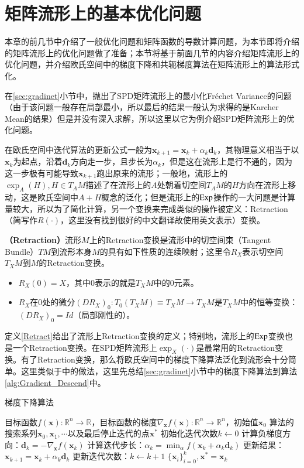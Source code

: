 \section{矩阵流形上的基本优化问题}
本章的前几节中介绍了一般优化问题和矩阵函数的导数计算问题，为本节即将介绍的矩阵流形上的优化问题做了准备；本节将基于前面几节的内容介绍矩阵流形上的优化问题，并介绍欧氏空间中的梯度下降和共轭梯度算法在矩阵流形上的算法形式化。

在\ref{sec:gradinet}小节中，抛出了SPD矩阵流形上的最小化Fr\'echet Variance的问题（由于该问题一般存在局部最小，所以最后的结果一般认为求得的是Karcher Mean的结果）但是并没有深入求解，所以这里以它为例介绍SPD矩阵流形上的优化问题。

在欧氏空间中迭代算法的更新公式一般为$\bm{x}_{k+1}=\bm{x}_{k}+\alpha_{k} \bm{d}_{k}$，其物理意义相当于以$\bm{x}_{k}$为起点，沿着$\bm{d}_{k}$方向走一步，且步长为$\alpha_{k}$，但是这在流形上是行不通的，因为这一步极有可能导致$\bm{x}_{k+1}$跑出原来的流形；一般地，流形上的$\exp_{A}(H),H \in T_{A}M$描述了在流形上的$A$处朝着切空间$T_{A}M$的$H$方向在流形上移动，这是欧氏空间中$A+H$概念的泛化；但是流形上的$\rm Exp$操作的一大问题是计算量较大，所以为了简化计算，另一个变换来完成类似的操作被定义：Retraction（简写作$R(\cdot)$，这里没有找到很好的中文翻译故使用英文表示）变换。
\begin{definition}
\label{Retract}
\textbf{（Retraction）}流形$M$上的Retraction变换是流形中的切空间束（Tangent Bundle）$TM$到流形本身$M$的具有如下性质的连续映射；这里令$R_{X}$表示切空间$T_{X}M$到$M$的Retraction变换。
\begin{itemize}
\label{Retraction_rules}
\item $R_{X}(0)=X$，其中$0$表示的就是$T_{X}M$中的0元素。
\item $R_{X}$在$0$处的微分$(DR_{X})_{0}:T_{0}(T_{X}M)\equiv T_{X}M\rightarrow T_{X}M$是$T_{X}M$中的恒等变换：$(DR_{X})_{0}=Id$（局部刚性的）。
\end{itemize}
\end{definition}

定义\ref{Retract}给出了流形上Retraction变换的定义；特别地，流形上的$\rm Exp$变换也是一个Retraction变换。在SPD矩阵流形上$\exp_{X}(\cdot)$是最常用的Retraction变换。有了Retraction变换，那么将欧氏空间中的梯度下降算法泛化到流形会十分简单。这里类似于\cite{Maniopt_DiscreteCurveFitting}中的做法，这里先总结\ref{sec:gradinet}小节中的梯度下降算法到算法\ref{alg:Gradient_Descend}中。
\begin{algorithm}[htb]
\caption{梯度下降算法}
\label{alg:Gradient_Descend}
\begin{algorithmic}[1]
\REQUIRE 目标函数$f(\bm{x}):\mathbb{R}^{n}\rightarrow \mathbb{R}$，目标函数的梯度$\nabla_{\bm{x}} f(\bm{x}):\mathbb{R}^{n}\rightarrow \mathbb{R}^{n}$，初始值$\bm{x}_0$
\ENSURE 算法的搜索系列$\bm{x}_0,\bm{x}_1,\cdots$以及最后停止迭代的点$\bm{x}^{*}$
\STATE 初始化迭代次数$k\leftarrow 0$
\STATE 计算负梯度方向：$\bm{d}_{k}=-\nabla_{\bm{x}}f(\bm{x}_k)$
\STATE 计算迭代步长：$\alpha_{k}=\min_{\alpha}f(\bm{x}_{k}+\alpha_{k}\bm{d}_{k})$
\STATE 更新结果：$\bm{x}_{k+1}=\bm{x}_{k}+\alpha_{k}\bm{d}_{k}$
\STATE 更新迭代次数：$k\leftarrow k+1$
\ENDWHILE
\RETURN $\{\bm{x}_i\}_{i=0}^{k},\bm{x}^{*}=\bm{x}_{k}$
\end{algorithmic}
\end{algorithm}

